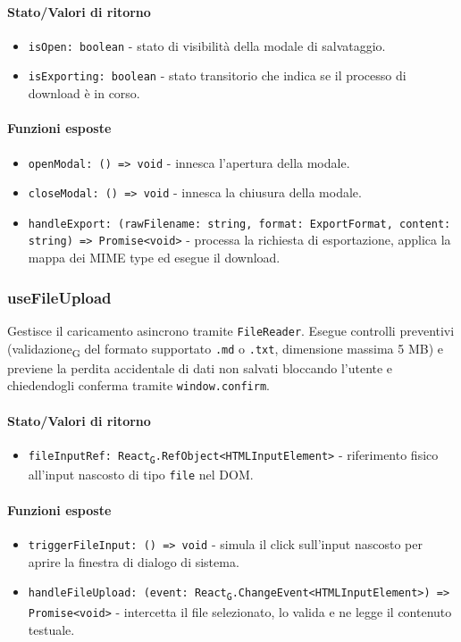 \documentclass[11pt,a4paper]{article}
\newcommand{\gls}[1]{#1\textsubscript{G}}
\begin{document}
\paragraph{Stato/Valori di ritorno}
\begin{itemize}
    \item \texttt{isOpen: boolean} - stato di visibilità della modale di salvataggio.
    \item \texttt{isExporting: boolean} - stato transitorio che indica se il processo di download è in corso.
\end{itemize}

\paragraph{Funzioni esposte}
\begin{itemize}
    \item \texttt{openModal: () => void} - innesca l'apertura della modale.
    \item \texttt{closeModal: () => void} - innesca la chiusura della modale.
    \item \texttt{handleExport: (rawFilename: string, format: ExportFormat, content: string) => Promise<void>} - processa la richiesta di esportazione, applica la mappa dei MIME type ed esegue il download.
\end{itemize}


\subsubsection{useFileUpload}
Gestisce il caricamento asincrono tramite \texttt{FileReader}. Esegue controlli preventivi (\gls{validazione} del formato supportato \texttt{.md} o \texttt{.txt}, dimensione massima 5 MB) e previene la perdita accidentale di dati non salvati bloccando l'utente e chiedendogli conferma tramite \texttt{window.confirm}.


\paragraph{Stato/Valori di ritorno}
\begin{itemize}
    \item \texttt{fileInputRef: \gls{React}.RefObject<HTMLInputElement>} - riferimento fisico all'input nascosto di tipo \texttt{file} nel DOM.
\end{itemize}

\paragraph{Funzioni esposte}
\begin{itemize}
    \item \texttt{triggerFileInput: () => void} - simula il click sull'input nascosto per aprire la finestra di dialogo di sistema.
    \item \texttt{handleFileUpload: (event: \gls{React}.ChangeEvent<HTMLInputElement>) => Promise<void>} - intercetta il file selezionato, lo valida e ne legge il contenuto testuale.
\end{itemize}
\end{document}
